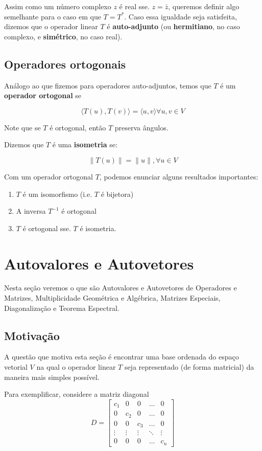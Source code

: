 \documentclass[12pt,a4paper]{article}
\begin{document}
Assim como um número complexo $z$ é real sse. $z = \bar{z}$, queremos definir algo semelhante para o caso em que $T = T^{\ast}$. Caso essa igualdade seja satisfeita, dizemos que o operador linear $T$ é \textbf{auto-adjunto} (ou \textbf{hermitiano}, no caso complexo, e \textbf{simétrico}, no caso real).

\subsection{Operadores ortogonais}

Análogo ao que fizemos para operadores auto-adjuntos, temos que $T$ é um \textbf{operador ortogonal} se 

\[
\langle T(u), T(v) \rangle = \langle u, v \rangle \forall u, v \in V
\]

Note que se $T$ é ortogonal, então $T$ preserva ângulos.

Dizemos que $T$ é uma \textbf{isometria} se:

\[
\|T(u)\| = \| u \|, \forall u \in V
\]

Com um operador ortogonal $T$, podemos enunciar alguns resultados importantes:

\begin{enumerate}
\item $T$ é um isomorfismo (i.e. $T$ é bijetora)
\item A inversa $T^{-1}$ é ortogonal
\item $T$ é ortogonal sse. $T$ é isometria.
\end{enumerate}

\newpage
\section{Autovalores e Autovetores}

Nesta seção veremos o que são Autovalores e Autovetores de Operadores e Matrizes, Multiplicidade Geométrica e Algébrica, Matrizes Especiais, Diagonalização e Teorema Espectral.

\subsection{Motivação}

A questão que motiva esta seção é encontrar uma base ordenada do espaço vetorial $V$ na qual o operador linear $T$ seja representado (de forma matricial) da maneira mais simples possível.

Para exemplificar, considere a matriz diagonal
\[
D = \begin{bmatrix}
c_1 & 0 & 0 & \ldots & 0 \\
0 & c_2 & 0 & \ldots & 0 \\
0 & 0 & c_3 & \ldots & 0 \\
\vdots & \vdots & \vdots & \ddots & \vdots \\
0 & 0 & 0 & \ldots & c_n
\end{bmatrix}
\]
\end{document}

